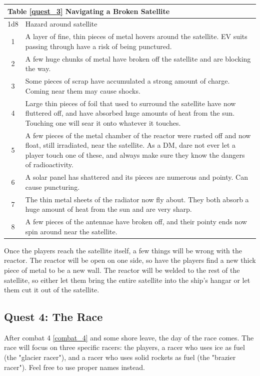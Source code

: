\documentclass[a4paper]{article}
\begin{document}
\begin{tabular}[t]{| c | p{12.5cm} |}
\toprule
\multicolumn{2}{|l|}{Table \ref{quest_3} Navigating a Broken Satellite} \\
\midrule
1d8 & Hazard around satellite \\
\midrule
1 & A layer of fine, thin pieces of metal hovers around the satellite. EV suits passing through have a risk of being punctured. \\
2 & A few huge chunks of metal have broken off the satellite and are blocking the way. \\
3 & Some pieces of scrap have accumulated a strong amount of charge. Coming near them may cause shocks. \\
4 & Large thin pieces of foil that used to surround the satellite have now fluttered off, and have absorbed huge amounts of heat from the sun. Touching one will sear it onto whatever it touches. \\
5 & A few pieces of the metal chamber of the reactor were rusted off and now float, still irradiated, near the satellite. As a DM, dare not ever let a player touch one of these, and always make sure they know the dangers of radioactivity. \\
6 & A solar panel has shattered and its pieces are numerous and pointy. Can cause puncturing. \\
7 & The thin metal sheets of the radiator now fly about. They both absorb a huge amount of heat from the sun and are very sharp. \\
8 & A few pieces of the antennae have broken off, and their pointy ends now spin around near the satellite. \\
\bottomrule
\end{tabular}

\vspace{0.2cm}
Once the players reach the satellite itself, a few things will be wrong with the reactor. The reactor will be open on one side, so have the players find a new thick piece of metal to be a new wall. The reactor will be welded to the rest of the satellite, so either let them bring the entire satellite into the ship's hangar or let them cut it out of the satellite.

\subsection{Quest 4: The Race} \label{quest_4}

After combat 4 \ref{combat_4} and some shore leave, the day of the race comes. The race will focus on three specific racers: the players, a racer who uses ice as fuel (the "glacier racer"), and a racer who uses solid rockets as fuel (the "brazier racer"). Feel free to use proper names instead. 
\end{document}
